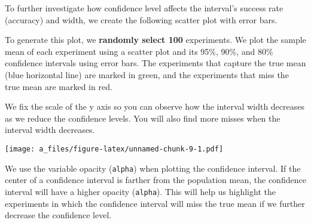 \documentclass[
]{article}
\newenvironment{Shaded}{\begin{snugshade}}{\end{snugshade}}
\newcommand{\AttributeTok}[1]{\textcolor[rgb]{0.77,0.63,0.00}{#1}}
\newcommand{\DecValTok}[1]{\textcolor[rgb]{0.00,0.00,0.81}{#1}}
\newcommand{\FloatTok}[1]{\textcolor[rgb]{0.00,0.00,0.81}{#1}}
\newcommand{\FunctionTok}[1]{\textcolor[rgb]{0.00,0.00,0.00}{#1}}
\newcommand{\NormalTok}[1]{#1}
\newcommand{\OtherTok}[1]{\textcolor[rgb]{0.56,0.35,0.01}{#1}}
\newcommand{\SpecialCharTok}[1]{\textcolor[rgb]{0.00,0.00,0.00}{#1}}
\newcommand{\StringTok}[1]{\textcolor[rgb]{0.31,0.60,0.02}{#1}}
\begin{document}
To further investigate how confidence level affects the interval's
success rate (accuracy) and width, we create the following scatter plot
with error bars.

To generate this plot, we \textbf{randomly select 100} experiments. We
plot the sample mean of each experiment using a scatter plot and its
95\%, 90\%, and 80\% confidence intervals using error bars. The
experiments that capture the true mean (blue horizontal line) are marked
in green, and the experiments that miss the true mean are marked in red.

We fix the scale of the y axis so you can observe how the interval width
decreases as we reduce the confidence levels. You will also find more
misses when the interval width decreases.

\begin{Shaded}
\end{Shaded}

\texttt{[image: a\_files/figure-latex/unnamed-chunk-9-1.pdf]}

We use the variable opacity (\texttt{alpha}) when plotting the
confidence interval. If the center of a confidence interval is farther
from the population mean, the confidence interval will have a higher
opacity (\texttt{alpha}). This will help us highlight the experiments in
which the confidence interval will miss the true mean if we further
decrease the confidence level.
\end{document}
